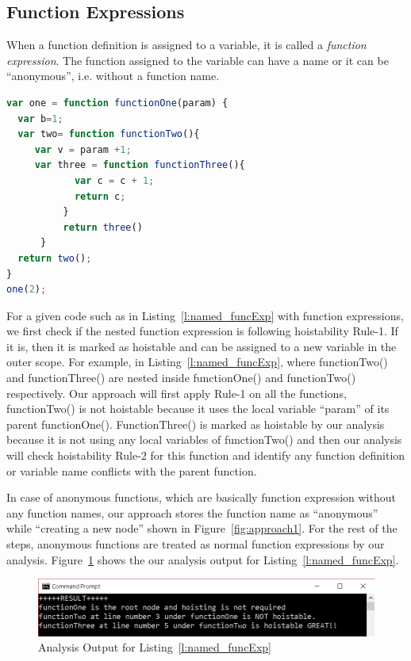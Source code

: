 \documentclass[authoryear,preprint]{sigplanconf}
\begin{document}
\subsection{Function Expressions}
When a function definition is assigned to a variable, it is called a \textit{function expression}. The function assigned to the variable can have a name or it can be \enquote{anonymous}, i.e. without a function name. \par

\lstset{numbers=left, numberstyle=\tiny, stepnumber=1, numbersep=5pt}
\lstset{basicstyle=\ttfamily}
\lstset{frame=tb, frame=bottomline}

\begin{lstlisting}[float,caption=Function Expression ,label=l:named_funcExp,language=JavaScript]
var one = function functionOne(param) {
  var b=1;
  var two= function functionTwo(){
     var v = param +1;
     var three = function functionThree(){
            var c = c + 1;
            return c;
          }
          return three()
      }
  return two();
}
one(2);
\end{lstlisting} 

For a given code such as in Listing~\ref{l:named_funcExp} with function expressions, we first check if the nested function expression is following hoistability Rule-1. If it is, then it is marked as hoistable and can be assigned to a new variable in the outer scope. For example, in Listing~\ref{l:named_funcExp}, where functionTwo() and functionThree() are nested inside functionOne() and  functionTwo() respectively. Our approach will first apply Rule-1 on all the functions, functionTwo() is not hoistable because it uses the local variable \enquote{param} of its parent functionOne(). FunctionThree() is marked as hoistable by our analysis because it is not using any local variables of functionTwo() and then our analysis will check hoistability Rule-2 for this function and identify any function definition or variable name conflicts with the parent function. 

In case of anonymous functions, which are basically function expression without any function names, our approach stores the function name as \enquote{anonymous} while \enquote{creating a new node} shown in Figure~\ref{fig:approach1}. For the rest of the steps, anonymous functions are treated as normal function expressions by our analysis. Figure~\ref{fig:result_func_exp} shows the our analysis output for Listing~\ref{l:named_funcExp}.


\begin{figure}[H]
  \centering
  \includegraphics[width=\linewidth]{result_func_exp.png}
  \caption{Analysis Output for Listing~\ref{l:named_funcExp}}
  \label{fig:result_func_exp}
\end{figure}
\end{document}
